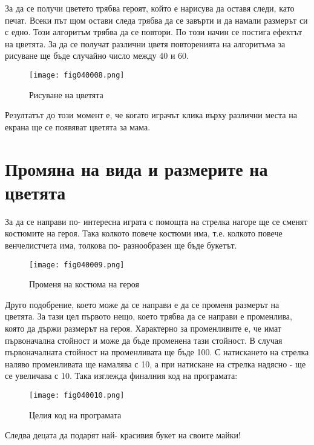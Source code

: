 За да се получи цветето трябва героят, който е нарисува да оставя следи, като печат. Всеки път щом остави следа трябва да се завърти и да намали размерът си с едно. Този алгоритъм трябва да се повтори. По този начин се постига ефектът на цветята. За да се получат различни цветя повторенията на алгоритъма за рисуване ще бъде случайно число между 40 и 60.

\begin{figure}[H]
  \centering
  \texttt{[image: fig040008.png]}
  \caption{Рисуване на цветята}
\label{fig040008}
\end{figure}

Резултатът до този момент е, че когато играчът клика върху различни места на екрана ще се появяват цветята за мама.

\section{Промяна на вида и размерите на цветята}

За да се направи по- интересна играта с помощта на стрелка нагоре ще се сменят костюмите на героя. Така колкото повече костюми има, т.е. колкото повече венчелистчета има, толкова по- разнообразен ще бъде букетът.

\begin{figure}[H]
  \centering
  \texttt{[image: fig040009.png]}
  \caption{Променя на костюма на героя}
\label{fig040009}
\end{figure}

Друго подобрение, което може да се направи е да се променя размерът на цветята. За тази цел първото нещо, което трябва да се направи е променлива, която да държи размерът на героя. Характерно за променливите е, че имат първоначална стойност и може да бъде променена тази стойност. В случая първоначалната стойност на променливата ще бъде 100. С натискането на стрелка наляво променливата ще намалява с 10, а при натискане на стрелка надясно - ще се увеличава с 10. Така изглежда финалния код на програмата:

\begin{figure}[H]
  \centering
  \texttt{[image: fig040010.png]}
  \caption{Целия код на програмата}
\label{fig040010}
\end{figure}

Следва децата да подарят най- красивия букет на своите майки!